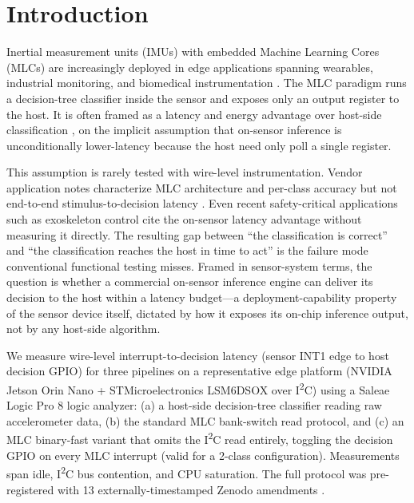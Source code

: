 \section{Introduction}

Inertial measurement units (IMUs) with embedded Machine Learning Cores (MLCs) are increasingly deployed in edge applications spanning wearables, industrial monitoring, and biomedical instrumentation \cite{ref1}. The MLC paradigm runs a decision-tree classifier inside the sensor and exposes only an output register to the host. It is often framed as a latency and energy advantage over host-side classification \cite{ref2,ref3}, on the implicit assumption that on-sensor inference is unconditionally lower-latency because the host need only poll a single register.

This assumption is rarely tested with wire-level instrumentation. Vendor application notes characterize MLC architecture and per-class accuracy but not end-to-end stimulus-to-decision latency \cite{ref2}. Even recent safety-critical applications such as exoskeleton control \cite{ref3} cite the on-sensor latency advantage without measuring it directly. The resulting gap between ``the classification is correct'' and ``the classification reaches the host in time to act'' is the failure mode conventional functional testing misses. Framed in sensor-system terms, the question is whether a commercial on-sensor inference engine can deliver its decision to the host within a latency budget---a deployment-capability property of the sensor device itself, dictated by how it exposes its on-chip inference output, not by any host-side algorithm.

We measure wire-level interrupt-to-decision latency (sensor INT1 edge to host decision GPIO) for three pipelines on a representative edge platform (NVIDIA Jetson Orin Nano + STMicroelectronics LSM6DSOX over I\textsuperscript{2}C) using a Saleae Logic Pro 8 logic analyzer: (a) a host-side decision-tree classifier reading raw accelerometer data, (b) the standard MLC bank-switch read protocol, and (c) an MLC binary-fast variant that omits the I\textsuperscript{2}C read entirely, toggling the decision GPIO on every MLC interrupt (valid for a 2-class configuration). Measurements span idle, I\textsuperscript{2}C bus contention, and CPU saturation. The full protocol was pre-registered with 13 externally-timestamped Zenodo amendments \cite{ref4}.

